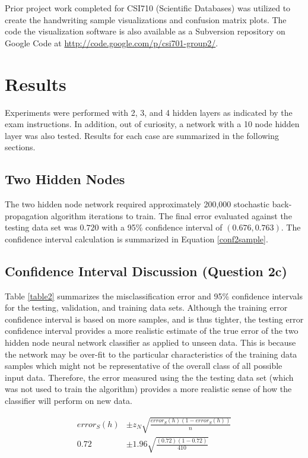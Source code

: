 \documentclass{article}
\begin{document}
Prior project work completed for CSI710 (Scientific Databases) was utilized to create the handwriting sample visualizations and confusion matrix plots. The code the visualization software is also available as a Subversion repository on Google Code at \url{http://code.google.com/p/csi701-group2/}.

\section{Results}\label{Results}

Experiments were performed with 2, 3, and 4 hidden layers as indicated by the exam instructions. In addition, out of curiosity, a network with a 10 node hidden layer was also tested. Results for each case are summarized in the following sections.

\subsection{Two Hidden Nodes}\label{hidden2}

The two hidden node network required approximately 200,000 stochastic back-propagation algorithm iterations to train. The final error evaluated against the testing data set was \(0.720\) with a 95\% confidence interval of \((0.676 , 0.763)\). The confidence interval calculation is summarized in Equation \ref{conf2sample}.

\subsection{Confidence Interval Discussion (Question 2c)}\label{conf2}

Table \ref{table2} summarizes the misclassification error and 95\% confidence intervals for the testing, validation, and training data sets. Although the training error confidence interval is based on more samples, and is thus tighter, the testing error confidence interval provides a more realistic estimate of the true error of the two hidden node neural network classifier as applied to unseen data. This is because the network may be over-fit to the particular characteristics of the training data samples which might not be representative of the overall class of all possible input data. Therefore, the error measured using the the testing data set (which was not used to train the algorithm) provides a more realistic sense of how the classifier will perform on new data. 

\begin{equation}\label{conf2sample}
\begin{split}
error_{S}(h) &\pm z_{N}\sqrt{\frac{error_{S}(h)(1-error_{S}(h))}{n}} \\
0.72 &\pm 1.96\sqrt{\frac{(0.72)(1-0.72)}{410}} 
\end{split}
\end{equation}
\end{document}
